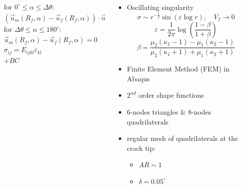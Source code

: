 \documentclass[first,firstsupp,lastsupp,last,hyperref,table]{ETHclass}
\begin{document}
\begin{frame}
\begin{columns}
\begin{column}{0.6\textwidth}
\begin{columns}
\begin{column}{0.6\columnwidth}
\tiny
\begin{equation*}
\begin{aligned}
&\text{for } 0^{\circ}\leq\alpha\leq\Delta\theta:\\
&\left(\overrightarrow{u}_{m}\left(R_{f},\alpha\right)-\overrightarrow{u}_{f}\left(R_{f},\alpha\right)\right)\cdot\overrightarrow{n}_{\alpha}\geq 0\\
&\text{for } \Delta\theta\leq\alpha\leq 180^{\circ}:\\
&\overrightarrow{u}_{m}\left(R_{f},\alpha\right)-\overrightarrow{u}_{f}\left(R_{f},\alpha\right)=0\\
&\sigma_{ij}=E_{ijkl}\varepsilon_{kl}\\
&+BC
\end{aligned}
\end{equation*}
\end{column}
\end{columns}
\end{column}
\begin{column}{0.3\textwidth}
\scriptsize
\begin{itemize}[label=]
\item Oscillating singularity
\vspace{-0.25cm}
\begin{equation*}
\sigma\sim r^{-\frac{1}{2}}\sin\left(\varepsilon\log r\right),\quad V_{f}\rightarrow 0
\end{equation*}
\vspace{-0.25cm}
{\tiny
\begin{equation*}
\varepsilon=\frac{1}{2\pi}\log\left(\frac{1-\beta}{1+\beta}\right)
\end{equation*}
\vspace{-0.25cm}
\begin{equation*}
\beta=\frac{\mu_{2}\left(\kappa_{1}-1\right)-\mu_{1}\left(\kappa_{2}-1\right)}{\mu_{2}\left(\kappa_{1}+1\right)+\mu_{1}\left(\kappa_{2}+1\right)}
\end{equation*}}
\item Finite Element Method (FEM) in Abaqus\texttrademark
\item $2^{nd}$ order shape functions
\item 6-nodes triangles \& 8-nodes quadrilaterals
\item regular mesh of quadrilaterals at the crack tip:
\begin{itemize}[label=-]
\item $AR\sim 1$
\item $\delta=0.05^{\circ}$
\end{itemize}
\end{itemize}
\end{column}
\end{columns}
\end{frame}
\end{document}
